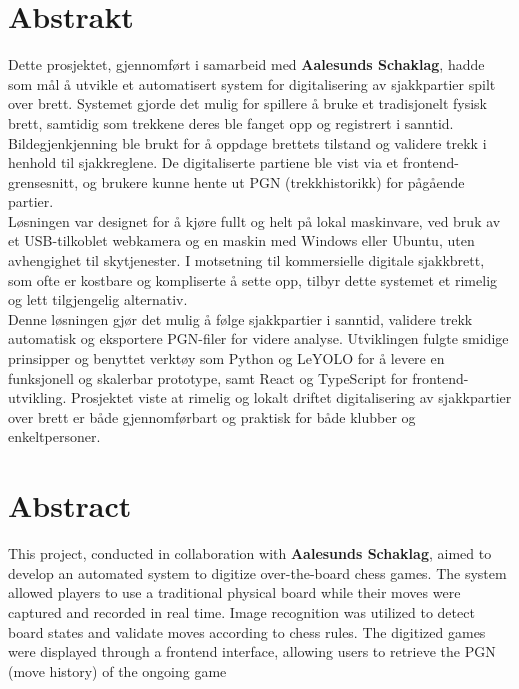 \chapter*{Abstrakt}

Dette prosjektet, gjennomført i samarbeid med \textbf{Aalesunds Schaklag}, hadde som mål å utvikle et automatisert system for digitalisering av sjakkpartier spilt over brett. Systemet gjorde det mulig for spillere å bruke et tradisjonelt fysisk brett, samtidig som trekkene deres ble fanget opp og registrert i sanntid. Bildegjenkjenning ble brukt for å oppdage brettets tilstand og validere trekk i henhold til sjakkreglene. De digitaliserte partiene ble vist via et frontend-grensesnitt, og brukere kunne hente ut PGN (trekkhistorikk) for pågående partier. \\

Løsningen var designet for å kjøre fullt og helt på lokal maskinvare, ved bruk av et USB-tilkoblet webkamera og en maskin med Windows eller Ubuntu, uten avhengighet til skytjenester. I motsetning til kommersielle digitale sjakkbrett, som ofte er kostbare og kompliserte å sette opp, tilbyr dette systemet et rimelig og lett tilgjengelig alternativ. \\

Denne løsningen gjør det mulig å følge sjakkpartier i sanntid, validere trekk automatisk og eksportere PGN-filer for videre analyse. Utviklingen fulgte smidige prinsipper og benyttet verktøy som Python og LeYOLO for å levere en funksjonell og skalerbar prototype, samt React og TypeScript for frontend-utvikling. Prosjektet viste at rimelig og lokalt driftet digitalisering av sjakkpartier over brett er både gjennomførbart og praktisk for både klubber og enkeltpersoner.

\chapter*{Abstract}
This project, conducted in collaboration with \textbf{Aalesunds Schaklag}, aimed to develop an automated system to digitize over-the-board chess games. The system allowed players to use a traditional physical board while their moves were captured and recorded in real time. Image recognition was utilized to detect board states and validate moves according to chess rules. The digitized games were displayed through a frontend interface, allowing users to retrieve the PGN (move history) of the ongoing game \\

